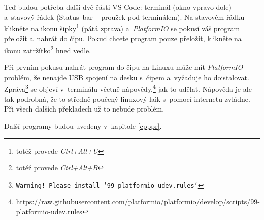  Teď budou potřeba další dvě části VS Code: terminál  (okno vpravo dole) a~stavový řádek (Status~bar -- proužek pod terminálem). 
 Na stavovém řádku klikněte na ikonu šipky\footnote{totéž provede {\it Ctrl+Alt+U}} (pátá zprava) a~{\it PlatformIO} se pokusí váš program přeložit a~nahrát do čipu. 
 Pokud chcete program pouze přeložit, klikněte na ikonu zatržítko\footnote{totéž provede {\it Ctrl+Alt+B}} hned vedle. 
 
 Při prvním pokusu nahrát program do čipu na Linuxu může mít {\it PlatformIO} problém, že nenajde USB spojení na desku s~čipem a~vyžaduje ho doistalovat. 
 Zpráva\footnote{\tt Warning! Please install `99-platformio-udev.rules`} se objeví v~terminálu včetně nápovědy,\footnote{\url{https://raw.githubusercontent.com/platformio/platformio/develop/scripts/99-platformio-udev.rules}} jak to udělat.
 Nápověda je ale tak podrobná, že to středně poučený linuxový laik s~pomocí internetu zvládne.
 Při všech dalších překladech už to nebude problém.  
 
 Další programy budou uvedeny v~kapitole \ref{cpppr}. 
 
 
 
 
